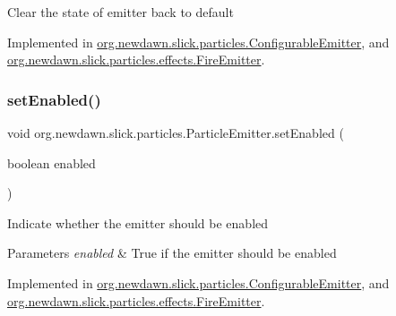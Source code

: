 Clear the state of emitter back to default 

Implemented in \mbox{\hyperlink{classorg_1_1newdawn_1_1slick_1_1particles_1_1_configurable_emitter_a91eff5a7a412cfed942a10a261a4432e}{org.\+newdawn.\+slick.\+particles.\+Configurable\+Emitter}}, and \mbox{\hyperlink{classorg_1_1newdawn_1_1slick_1_1particles_1_1effects_1_1_fire_emitter_a8caebb6bf21a766da28469533db95b37}{org.\+newdawn.\+slick.\+particles.\+effects.\+Fire\+Emitter}}.

\mbox{\label{interfaceorg_1_1newdawn_1_1slick_1_1particles_1_1_particle_emitter_a0db4bbc7bb9b5cc2b828993e065db057}} 
\subsubsection{\texorpdfstring{set\+Enabled()}{setEnabled()}}
{\footnotesize\ttfamily void org.\+newdawn.\+slick.\+particles.\+Particle\+Emitter.\+set\+Enabled (\begin{DoxyParamCaption}\item[{boolean}]{enabled }\end{DoxyParamCaption})}

Indicate whether the emitter should be enabled


\begin{DoxyParams}{Parameters}
{\em enabled} & True if the emitter should be enabled \\
\hline
\end{DoxyParams}


Implemented in \mbox{\hyperlink{classorg_1_1newdawn_1_1slick_1_1particles_1_1_configurable_emitter_a7a8a0b2b5f5ecbe56ef46310a219a45b}{org.\+newdawn.\+slick.\+particles.\+Configurable\+Emitter}}, and \mbox{\hyperlink{classorg_1_1newdawn_1_1slick_1_1particles_1_1effects_1_1_fire_emitter_a9558a088fe132a0ea0bc5fd74585b9a1}{org.\+newdawn.\+slick.\+particles.\+effects.\+Fire\+Emitter}}.

\mbox{\label{interfaceorg_1_1newdawn_1_1slick_1_1particles_1_1_particle_emitter_a18e2a8e6264aa46fb874f992c2093e15}} 
